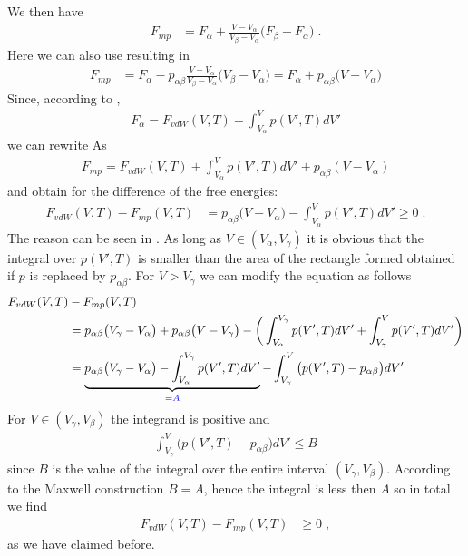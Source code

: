 %
We then have
%
\begin{align}\label{eq:F:mp:a}
F_{mp} &= 
 F_{\alpha} + \frac{V-V_{\alpha}}{V_{\beta}-V_{\alpha}} \big(F_{\beta}-F_{\alpha}\big)\;.
\end{align}
%
Here we can also use  resulting in
\begin{align}
F_{mp} &= 
 F_{\alpha}-p_{\alpha\beta} \frac{V-V_{\alpha}}{V_{\beta}-V_{\alpha}} \big(V_{\beta}-V_{\alpha}\big)
 =
 F_{\alpha}+p_{\alpha\beta} \big(V-V_{\alpha}\big)
\label{eq:F:mp}
\end{align}
Since, according to , 
\begin{align*}
F_\alpha = F_{vdW}(V,T) + \int_{V_\alpha}^{V} p(V',T) dV'
\end{align*}
we can rewrite  As
\begin{align*}
F_{mp} = F_{vdW}(V,T) + \int_{V_\alpha}^{V} p(V', T) dV' + p_{\alpha\beta}(V-V_\alpha)
\end{align*}
and obtain for the difference of the free energies:
\begin{align*}
F_{vdW}(V,T) - F_{mp}(V,T) &= 
p_{\alpha\beta} \big(V-V_{\alpha}\big) 
- \int_{V_{\alpha}}^{V} p(V',T) dV'  \ge 0 \;.
\end{align*}
%
The reason can be seen in . As long as $V\in(V_{\alpha},V_{\gamma})$
it is obvious that the integral over $p(V',T)$ is smaller than the area of the rectangle formed
obtained if $p$ is replaced by $p_{\alpha\beta}$. For $V> V_{\gamma}$ we can modify the equation as follows
\begin{align*}
F_{vdW}(V,T) &- F_{mp}(V,T)  \\
&=p_{\alpha\beta} \big(V_{\gamma}-V_{\alpha}\big) +
p_{\alpha\beta} \big(V-V_{\gamma}\big) 
- \bigg( \int_{V_{\alpha}}^{V_{\gamma}} p(V',T) dV'  + \int_{V_{\gamma}}^{V} p(V',T) dV' \bigg)\\
&= \underbrace{
p_{\alpha\beta} \big(V_{\gamma}-V_{\alpha}\big) -\int_{V_{\alpha}}^{V_{\gamma}} 
p(V',T) dV'}_{\color{blue} = A}
-     \int_{V_{\gamma}}^{V} \big(p(V',T)-p_{\alpha\beta}\big) dV'\\
\end{align*}
%
For $V \in (V_{\gamma},V_{\beta})$ the integrand  is positive and 
%
\begin{align*}
\int_{V_{\gamma}}^{V} \big(p(V',T)-p_{\alpha\beta}\big) dV' \le B
\end{align*}
%
since $B$ is the value of the integral over the entire interval $(V_{\gamma},V_{\beta})$.
According to the Maxwell construction $B=A$, hence the integral is less then $A$ so in total we find
\begin{align*}
F_{vdW}(V,T) - F_{mp}(V,T)  &\ge 0\;,
\end{align*}
%
as we have claimed before.

